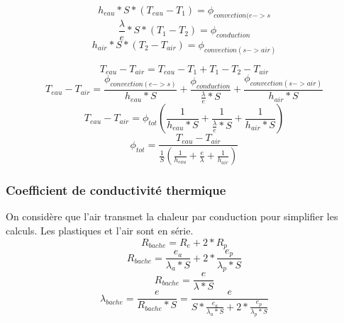 \documentclass{beamer}
\begin{document}
  \begin{frame}
    \[h_{eau}*S*(T_{eau} - T_{1}) = \phi_{convection(e->s}\]
    \[\frac{\lambda}{e} * S * (T_{1} - T_{2}) = \phi_{conduction}\]
    \[h_{air}*S*(T_{2} - T_{air}) = \phi_{convection(s->air)}\]
  \end{frame}
  \begin{frame}
    \[T_{eau} - T_{air} = T_{eau} - T_{1} + T_{1} - T_{2} - T_{air}\]
    \[T_{eau} - T_{air} = \frac{\phi_{convection(e->s)}}{h_{eau}*S} + \frac{\phi_{conduction}}{\frac{\lambda}{e} * S} + \frac{\phi_{convection(s->air)}}{h_{air}*S} \]
    \[T_{eau} - T_{air} = \phi_{tot}(\frac{1}{h_{eau}*S} + \frac{1}{\frac{\lambda}{e} * S} + \frac{1}{h_{air}*S}) \]
    \[\phi_{tot} = \frac{T_{eau} - T_{air}}{\frac{1}{S}(\frac{1}{h_{eau}} + \frac{e}{\lambda} + \frac{1}{h_{air}})}\]
  \end{frame}
  \begin{frame}
   \frametitle{Coefficient de conductivité thermique}
   On considère que l'air transmet la chaleur par conduction pour simplifier les calculs.
   Les plastiques et l'air sont en série.
   \[R_{bache} = R_{e} + 2 * R_{p}\]
   \[R_{bache} = \frac{e_{a}}{\lambda_{a} * S} + 2 * \frac{e_{p}}{\lambda_{p} * S}\]
   \[R_{bache} = \frac{e}{\lambda * S}\]
   \[\lambda_{bache} = \frac{e}{R_{bache} * S} = \frac{e}{S* \frac{e_{a}}{\lambda_{a} * S} + 2 * \frac{e_{p}}{\lambda_{p} * S}}\]
   
  \end{frame}
\end{document}
